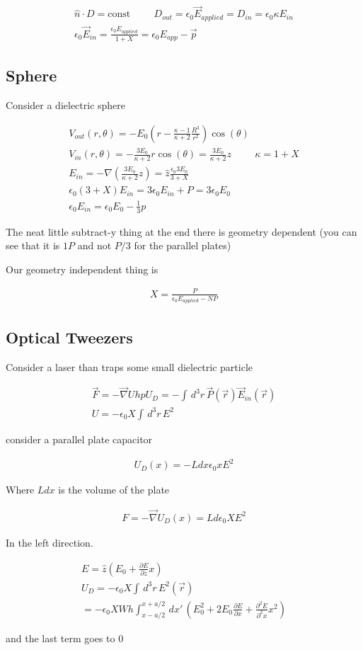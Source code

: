 \documentclass[fleqn]{report}
\newcommand{\hp}{\hspace{1cm}}
\newcommand{\const}{\textrm{const}}
\newcommand{\del}{\partial}
\newcommand{\equations} [1] {
\begin{gather*}
#1
\end{gather*}
}
\begin{document}
\equations{
    \hat n \cdot D = \const 
    \hp 
    D_{out} = \epsilon_0 \vec E_{applied}
    = 
    D_{in} = \epsilon_0 \kappa E_{in}
    \\
    \epsilon_0 \vec E_{in} 
    = 
    \frac{\epsilon_0 E_{applied}}{1 + X}
    =
    \epsilon_0 E_{app} - \vec p
}

\subsection{Sphere}
Consider a dielectric sphere 

\equations{
    V_{out}(r, \theta)
    =
    - E_{0}
    \left(
        r
        -
        \frac{\kappa - 1}{\kappa + 2}
        \frac{R^3}{r^2} 
    \right)
    \cos(\theta)
    \\
    V_{in}(r, \theta)
    = 
    -
    \frac{3 E_0}{\kappa + 2}
    r \cos(\theta)
    =
    \frac{3 E_0}{\kappa + 2}
    z
    \hp 
    \kappa = 1 + X
    \\
    E_{in}
    =
    -\nabla 
    \left(
        \frac{3 E_0}{\kappa + 2}
        z
    \right)
    =
    \hat z 
    \frac{\epsilon_0 3 E_0}{3 + X}
    \\
    \epsilon_0 (3 + X) E_{in} = 3 \epsilon_0 E_{in} + P = 3 \epsilon_0 E_0
    \\
    \epsilon_0 E_{in}
    =
    \epsilon_0 E_{0} - \frac{1}{3} p
}

The neat little subtract-y thing at the end there is geometry dependent 
(you can see that it is $1P$ and not $P/3$ for the parallel plates)

Our geometry independent thing is 
\equations{
    X = \frac{P}{\epsilon_0 E_{applied} - NP}
}

\subsection{Optical Tweezers}
Consider a laser than traps some small dielectric particle
\equations{
    \vec F = - \vec \nabla U 
    hp 
    U_{D} = -\int \, d^3 r \, \vec P(\vec r) \vec E_{in}(\vec r)
    \\
    U = - \epsilon_0 X \int \, d^3 r \, E^2 
}

consider a parallel plate capacitor 
\equations{
    U_D(x) 
    =
    - L d x \epsilon_0 x E^2 
}
Where $L dx$ is the volume of the plate 

\equations{
    F = 
    - \vec \nabla U_D(x) 
    =
    L d \epsilon_0 X E^2 
}
In the left direction. 

\equations{
    E = \hat z 
    \left(
        E_0 + \frac{\del E}{\del z} x
    \right)
    \\
    U_D = -\epsilon_0 X 
    \int \, d^3 r \, 
    E^2(\vec r) 
    \\
    =
    - \epsilon_0 X W h 
    \int^{x + a/2}_{x - a/2} \, dx' \, 
    \left( 
        E_0^2 
        + 
        2 E_0 \frac{\del E}{\del x}
        +
        \frac{\del^2 E}{\del^2 x} x^2 
    \right)
}
and the last term goes to $0$ 
\end{document}

